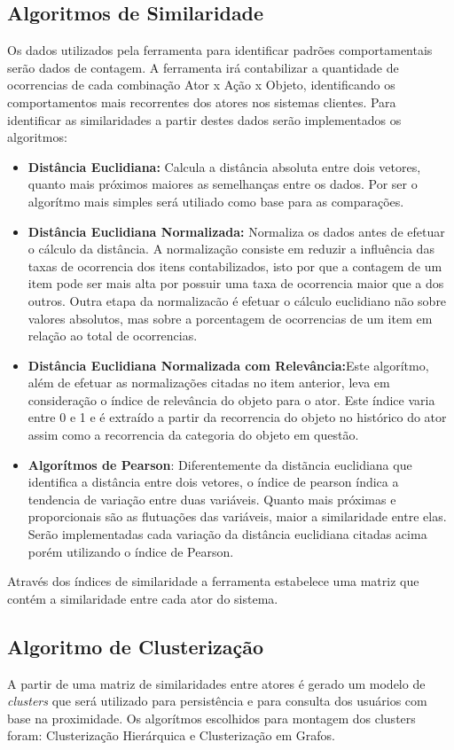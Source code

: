 \documentclass[
	12pt,				%
    oneside,			%
	a4paper,			%
	english,			%
	french,				%
	spanish,			%
	brazil,				%
	]{abntex2}
\begin{document}
\subsection{Algoritmos de Similaridade}
Os dados utilizados pela ferramenta para identificar padrões comportamentais serão dados de contagem. A ferramenta irá contabilizar a quantidade de ocorrencias de cada combinação Ator x Ação x Objeto, identificando
os comportamentos mais recorrentes dos atores nos sistemas clientes. Para identificar as similaridades a partir destes dados serão implementados os algoritmos:

\begin{itemize}
	\item \textbf{Distância Euclidiana:} Calcula a distância absoluta entre dois vetores, quanto mais próximos maiores as semelhanças entre os dados. Por ser o algorítmo mais simples será utiliado como base para as comparações.
	\item \textbf{Distância Euclidiana Normalizada:} Normaliza os dados antes de efetuar o cálculo da distância. A normalização consiste em reduzir a influência das taxas de ocorrencia dos itens contabilizados, isto por que a contagem de um item
	pode ser mais alta por possuir uma taxa de ocorrencia maior que a dos outros. Outra etapa da normalizacão é efetuar o cálculo euclidiano não sobre valores absolutos, mas sobre a porcentagem de ocorrencias de um item em relação ao total de ocorrencias.
	\item \textbf{Distância Euclidiana Normalizada com Relevância:}Este algorítmo, além de efetuar as normalizações citadas no item anterior, leva em consideração o índice de relevância do objeto para o ator. Este índice varia entre 0 e 1 e é extraído a 
	partir da recorrencia do objeto no histórico do ator assim como a recorrencia da categoria do objeto em questão.
	\item \textbf{Algorítmos de Pearson}: Diferentemente da distãncia euclidiana que identifica a distância entre dois vetores, o índice de pearson índica a tendencia de variação entre duas variáveis. Quanto mais próximas e proporcionais são as flutuações 
	das variáveis, maior a similaridade entre elas. Serão implementadas cada variação da distância euclidiana citadas acima porém utilizando o índice de Pearson.
\end{itemize}

Através dos índices de similaridade a ferramenta estabelece uma matriz que contém a similaridade entre cada ator do sistema.

\subsection{Algoritmo de Clusterização}
A partir de uma matriz de similaridades entre atores é gerado um modelo de \textit{clusters} que será utilizado para persistência e para consulta dos usuários com base na proximidade. Os algorítmos escolhidos para montagem dos clusters foram: 
Clusterização Hierárquica e Clusterização em Grafos. 
\end{document}
